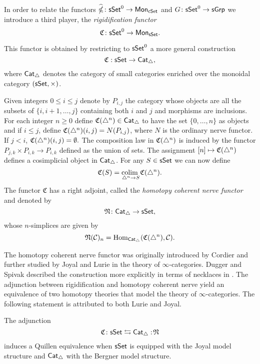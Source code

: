 In order to relate the functors $\widehat{\operatorname{\mathbb{\Omega}}} \colon \mathsf{sSet}^0 \to \mathsf{Mon}_{\mathsf{cSet}}$ and $G \colon \mathsf{sSet}^0\to \mathsf{sGrp}$ we introduce a third player, the \textit{rigidification functor} $$\mathfrak{C} \colon \mathsf{sSet}^0 \to \mathsf{Mon}_{\mathsf{sSet}}.$$

This functor is obtained by restricting to $\mathsf{sSet}^0$ a more general construction
$$\mathfrak{C}: \mathsf{sSet} \to \mathsf{Cat}_{\triangle},$$
where $\mathsf{Cat}_{\triangle}$ denotes the category of small categories enriched over the monoidal category $(\mathsf{sSet}, \times)$. 

Given integers $0 \leq  i \leq j$ denote by $P_{i,j}$ the category whose objects are all the subsets of $\{i, i+1, \dots, j\}$ containing both $i$ and $j$ and morphisms are inclusions.
For each integer $n \geq 0$ define $\mathfrak{C}(\triangle^n) \in \mathsf{Cat}_{\triangle}$ to have the set $\{0, \dots, n\}$ as objects and if $i \leq j$, define $\mathfrak{C}(\triangle^n)(i,j)= N(P_{i,j})$, where $N$ is the ordinary nerve functor.
If $j < i$, $\mathfrak{C}(\triangle^n)(i,j) = \emptyset.$ The composition law in $\mathfrak{C}(\triangle^n)$ is induced by the functor $P_{j,k} \times P_{i,k} \to P_{i,k}$ defined as the union of sets.
The assignment $[n] \mapsto \mathfrak{C}(\triangle^n)$ defines a cosimplicial object in $\mathsf{Cat}_{\triangle}$.
For any $S \in \mathsf{sSet}$ we can now define
 $$\mathfrak{C}(S) = \underset{{\triangle^n \to S} }{\text{colim }} \mathfrak{C}(\triangle^n).$$
The functor $\mathfrak{C}$ has a right adjoint, called the \textit{homotopy coherent nerve functor} and denoted by
$$\mathfrak{N} \colon \mathsf{Cat}_{\triangle} \to \mathsf{sSet},$$ whose $n$-simplices are given by 
$$\mathfrak{N}(\mathcal{C})_n=\text{Hom}_{\mathsf{Cat}_{\triangle}}(\mathfrak{C}(\triangle^n), \mathcal{C}).$$

The homotopy coherent nerve functor was originally introduced by Cordier and further studied by Joyal and Lurie in the theory of $\infty$-categories.
Dugger and Spivak described the construction more explicitly in terms of necklaces in \cite{dugger2011rigidification}.
The adjunction between rigidification and homotopy coherent nerve yield an equivalence of two homotopy theories that model the theory of $\infty$-categories.
The following statement is attributed to both Lurie and Joyal.

\begin{theorem} \label{joyalbergner}
	The adjunction $$ \mathfrak{C} \colon \mathsf{sSet} \leftrightarrows \mathsf{Cat}_{\triangle} :\!\mathfrak{N}$$ induces a Quillen equivalence when $\mathsf{sSet}$ is equipped with the Joyal model structure and $\mathsf{Cat}_{\triangle}$ with the Bergner model structure.
\end{theorem}


